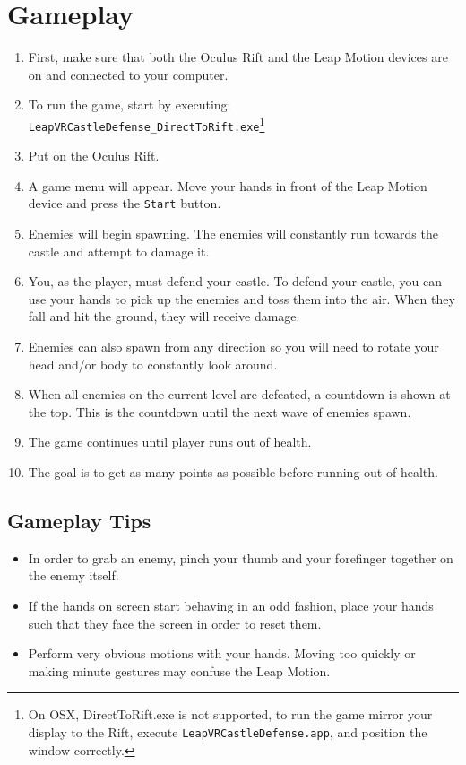 \documentclass[a4paper]{refart}
\begin{document}
\pagebreak

\section{Gameplay}

\begin{enumerate}
	\item First, make sure that both the Oculus Rift and the Leap Motion devices are on and connected to your computer.
	\item To run the game, start by executing:\\
		 \texttt{LeapVRCastleDefense\_DirectToRift.exe}\footnote{On OSX, DirectToRift.exe is not supported, to run the game mirror your display to the Rift, execute \texttt{LeapVRCastleDefense.app}, and position the window correctly.}
	\item Put on the Oculus Rift.
	\item A game menu will appear. Move your hands in front of the Leap Motion device and press the \texttt{Start} button.
	\item Enemies will begin spawning. The enemies will constantly run towards the castle and attempt to damage it. 
	\item You, as the player, must defend your castle. To defend your castle, you can use your hands to pick up the enemies and toss them into the air. When they fall and hit the ground, they will receive damage. 
	\item Enemies can also spawn from any direction so you will need to rotate your head and/or body to constantly look around.
	\item When all enemies on the current level are defeated, a countdown is shown at the top. This is the countdown until the next wave of enemies spawn. 
	\item The game continues until player runs out of health.
	\item The goal is to get as many points as possible before running out of health.
\end{enumerate}

\subsection{Gameplay Tips}

\begin{itemize}
	\item In order to grab an enemy, pinch your thumb and your forefinger together on the enemy itself.
	\item If the hands on screen start behaving in an odd fashion, place your hands such that they face the screen in order to reset them.
	\item Perform very obvious motions with your hands.  Moving too quickly or making minute gestures may confuse the Leap Motion.
\end{itemize}
\end{document}
